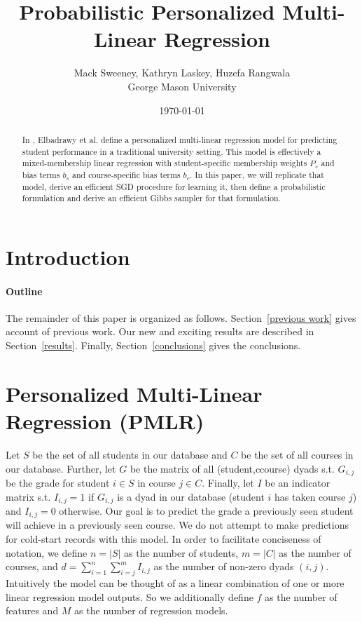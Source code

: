 \documentclass[10pt]{proc}
\title{Probabilistic Personalized Multi-Linear Regression}
\author{
    Mack Sweeney, Kathryn Laskey, Huzefa Rangwala\\
        George Mason University
}
\date{\today}
\begin{document}
\maketitle


\begin{abstract}

In \cite{elbadrawy_personalized_2015}, Elbadrawy et al. define a personalized
multi-linear regression model for predicting student performance in a
traditional university setting. This model is effectively a mixed-membership
linear regression with student-specific membership weights $P_s$ and bias terms
$b_s$ and course-specific bias terms $b_c$. In this paper, we will replicate
that model, derive an efficient SGD procedure for learning it, then define a
probabilistic formulation and derive an efficient Gibbs sampler for that
formulation.

\end{abstract}


\section{Introduction}

\paragraph{Outline}
The remainder of this paper is organized as follows.
Section~\ref{previous work} gives account of previous work.
Our new and exciting results are described in Section~\ref{results}.
Finally, Section~\ref{conclusions} gives the conclusions.


\section{Personalized Multi-Linear Regression (PMLR)}

Let $S$ be the set of all students in our database and $C$ be the set of all
courses in our database. Further, let $G$ be the matrix of all (student,ccourse)
dyads s.t. $G_{i,j}$ be the grade for student $i \in S$ in course $j \in C$.
Finally, let $I$ be an indicator matrix s.t. $I_{i,j} = 1$ if $G_{i,j}$ is a
dyad in our database (student $i$ has taken course $j$) and $I_{i,j} = 0$
otherwise. Our goal is to predict the grade a previously seen student will
achieve in a previously seen course. We do not attempt to make predictions for
cold-start records with this model. In order to facilitate conciseness of
notation, we define $n = |S|$ as the number of students, $m = |C|$ as the number
of courses, and $d = \sum_{i=1}^n \sum_{i=j}^m I_{i,j}$ as the number of
non-zero dyads $(i,j)$. Intuitively the model can be thought of as a linear
combination of one or more linear regression model outputs. So we additionally
define $f$ as the number of features and $M$ as the number of regression models.
\end{document}
